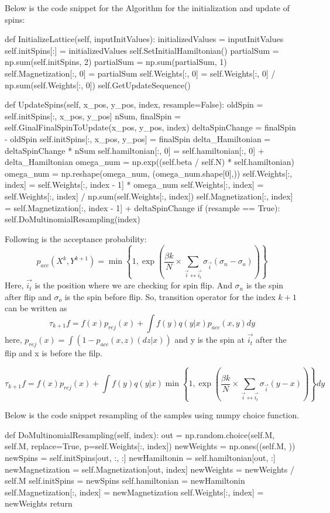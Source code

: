 \documentclass[11pt]{article}
\begin{document}
\noindent Below is the code snippet for the Algorithm for the initialization and update of spins:
\begin{python}	
def InitializeLattice(self, inputInitValues):
	initializedValues = inputInitValues
	self.initSpins[:] = initializedValues
	self.SetInitialHamiltonian()
	partialSum = np.sum(self.initSpins, 2)
	partialSum = np.sum(partialSum, 1)
	self.Magnetization[:, 0] = partialSum
	self.Weights[:, 0] = self.Weights[:, 0] / np.sum(self.Weights[:, 0])
	self.GetUpdateSequence()
		
def UpdateSpins(self, x_pos, y_pos, index, resample=False):
	oldSpin = self.initSpins[:, x_pos, y_pos]
	nSum, finalSpin = self.GinalFinalSpinToUpdate(x_pos, y_pos, index)
	deltaSpinChange = finalSpin - oldSpin
	self.initSpins[:, x_pos, y_pos] = finalSpin
	delta_Hamiltonian = deltaSpinChange * nSum
	self.hamiltonian[:, 0] = self.hamiltonian[:, 0] + delta_Hamiltonian
	omega_num = np.exp((self.beta / self.N) * self.hamiltonian)
	omega_num = np.reshape(omega_num, (omega_num.shape[0],))
	self.Weights[:, index] = self.Weights[:, index - 1] * omega_num
	self.Weights[:, index] = self.Weights[:, index] / np.sum(self.Weights[:, index])
	self.Magnetization[:, index] = self.Magnetization[:, index - 1] + deltaSpinChange
	if (resample == True):
		self.DoMultinomialResampling(index)
\end{python}

Following is the acceptance probability:
$$p_{acc}(X^k, Y^{k + 1}) = \min\left\{1,\exp{\left(\frac{\beta k}{N} \times \sum_{{\overrightarrow{i}} \leftrightarrow \overrightarrow{i_{t}}} \sigma_{\overrightarrow{i}} (\sigma_n - \sigma_o) \right)}\right\}$$
Here, $\overrightarrow{i_{t}}$ is the position where we are checking for spin flip. And $\sigma_n$ is the spin after flip and $\sigma_o$ is the spin before flip.
So, transition operator for the index $k + 1$ can be written as
$$\tau_{k + 1} f = f(x) p_{rej} (x) + \int f(y) q(y|x) p_{acc}(x,y) dy$$
here, $p_{rej}(x) = \int (1 - p_{acc}(x,z) (dz | x))$ and y is the spin at $\overrightarrow{i_{t}}$ after the flip and x is before the filp.

$$\tau_{k + 1} f = f(x) p_{rej} (x) + \int f(y) q(y|x) \min\left\{1,\exp{\left(\frac{\beta k}{N} \times \sum_{{\overrightarrow{i}} \leftrightarrow \overrightarrow{i_{t}}} \sigma_{\overrightarrow{i}} (y - x) \right)}\right\} dy$$

\noindent Below is the code snippet resampling of the samples using numpy choice function.
\begin{python}
def DoMultinomialResampling(self, index):
	out = np.random.choice(self.M, self.M, replace=True, p=self.Weights[:, index])
	newWeights = np.ones((self.M, ))
	newSpins = self.initSpins[out, :, :]
	newHamiltonin = self.hamiltonian[out, :]
	newMagnetization = self.Magnetization[out, index]
	newWeights = newWeights / self.M
	self.initSpins = newSpins
	self.hamiltonian = newHamiltonin
	self.Magnetization[:, index] = newMagnetization
	self.Weights[:, index] = newWeights
	return
\end{python}
\end{document}
